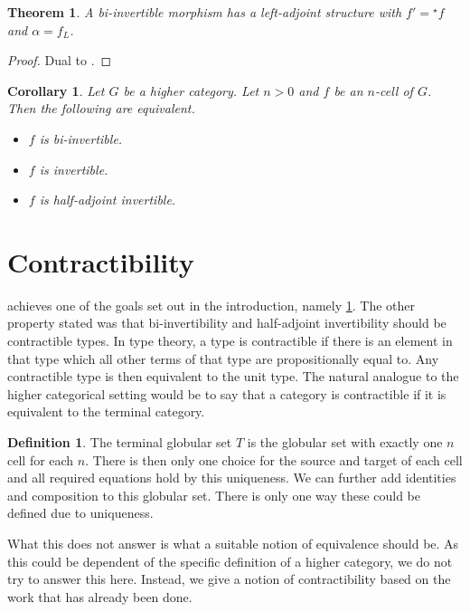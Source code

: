 \documentclass{article}
\newtheorem{theorem}{Theorem}
\newtheorem{cor}{Corollary}
\theoremstyle{definition}
\newtheorem{definition}{Definition}
\theoremstyle{remark}
\newcommand{\linv}[1]{{}^\star\!#1}
\begin{document}
\begin{theorem}
  A bi-invertible morphism has a left-adjoint structure with \(f' = \linv f\) and \(\alpha = f_L\).
\end{theorem}
\begin{proof}
  Dual to .
\end{proof}

\begin{cor}\label{cor:equiv}
  Let \(G\) be a higher category. Let \(n > 0\) and \(f\) be an \(n\)-cell of \(G\). Then the following are equivalent.
  \begin{itemize}
  \item \(f\) is bi-invertible.
  \item \(f\) is invertible.
  \item \(f\) is half-adjoint invertible.
  \end{itemize}
\end{cor}

\section{Contractibility}\label{sec:contractibility}

 achieves one of the goals set out in the introduction, namely \cref{cor:equiv}. The other property stated was that bi-invertibility and half-adjoint invertibility should be contractible types. In type theory, a type is contractible if there is an element in that type which all other terms of that type are propositionally equal to. Any contractible type is then equivalent to the unit type. The natural analogue to the higher categorical setting would be to say that a category is contractible if it is equivalent to the terminal category.

\begin{definition}
  The terminal globular set \(T\) is the globular set with exactly one \(n\) cell for each \(n\). There is then only one choice for the source and target of each cell and all required equations hold by this uniqueness.
  We can further add identities and composition to this globular set. There is only one way these could be defined due to uniqueness.
\end{definition}

What this does not answer is what a suitable notion of equivalence should be. As this could be dependent of the specific definition of a higher category, we do not try to answer this here. Instead, we give a notion of contractibility based on the work that has already been done.
\end{document}
